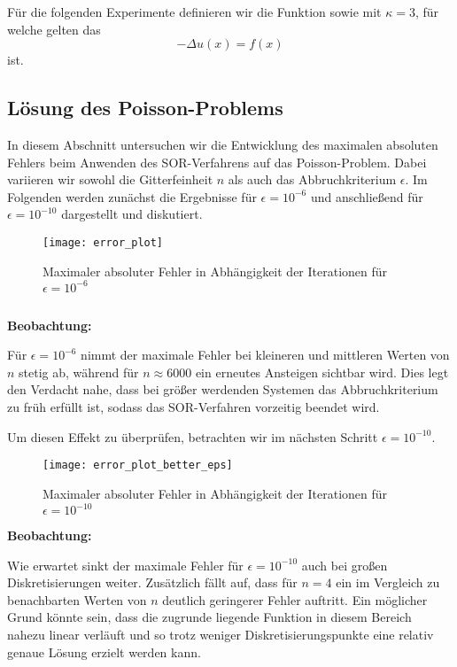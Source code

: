 \documentclass{scrartcl}
\newenvironment{code}{\captionsetup{type=listing}}{}
\begin{document}
Für die folgenden Experimente definieren wir die Funktion  sowie
 mit \(\kappa = 3\), für welche gelten das
\[
    - \Delta u(x) = f(x)
\]
ist.

\subsection{Lösung des Poisson-Problems}

In diesem Abschnitt untersuchen wir die Entwicklung des maximalen absoluten
Fehlers beim Anwenden des SOR-Verfahrens auf das Poisson-Problem. Dabei
variieren wir sowohl die Gitterfeinheit \(n\) als auch das Abbruchkriterium
\(\epsilon\). Im Folgenden werden zunächst die Ergebnisse für \(\epsilon =
10^{-6}\) und anschließend für \(\epsilon = 10^{-10}\) dargestellt und
diskutiert.

\begin{figure}[H]
    \centering
    \texttt{[image: error\_plot]}
    \caption{Maximaler absoluter Fehler in Abhängigkeit der Iterationen für
        $\epsilon = 10^{-6}$}
    \label{fig:error_plot}
\end{figure}

\begin{code}
    \label{code:error_plot}
    \inputminted[firstline=3, lastline=9]{bash}{figures/generate.sh}
\end{code}

\textbf{Beobachtung:}

Für \(\epsilon = 10^{-6}\) nimmt der maximale Fehler bei kleineren und
mittleren Werten von \(n\) stetig ab, während für \(n \approx 6000\) ein
erneutes Ansteigen sichtbar wird. Dies legt den Verdacht nahe, dass bei größer
werdenden Systemen das Abbruchkriterium zu früh erfüllt ist, sodass das
SOR-Verfahren vorzeitig beendet wird.

Um diesen Effekt zu überprüfen, betrachten wir im nächsten Schritt \(\epsilon =
10^{-10}\).

\begin{figure}[H]
    \centering
    \texttt{[image: error\_plot\_better\_eps]}
    \caption{Maximaler absoluter Fehler in Abhängigkeit der Iterationen für
        $\epsilon = 10^{-10}$}
    \label{fig:error_plot_better_eps}
\end{figure}

\textbf{Beobachtung:}

Wie erwartet sinkt der maximale Fehler für \(\epsilon = 10^{-10}\) auch bei
großen Diskretisierungen weiter. Zusätzlich fällt auf, dass für \(n = 4\) ein
im Vergleich zu benachbarten Werten von \(n\) deutlich geringerer Fehler
auftritt. Ein möglicher Grund könnte sein, dass die zugrunde liegende Funktion
in diesem Bereich nahezu linear verläuft und so trotz weniger
Diskretisierungspunkte eine relativ genaue Lösung erzielt werden kann.
\end{document}
